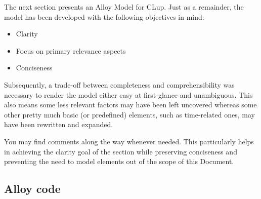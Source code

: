 The next section presents an Alloy Model for CLup. Just as a remainder, the model has been developed with the following objectives in mind: \newline

\begin{itemize}
    \item Clarity
    \item Focus on primary relevance aspects
    \item Conciseness
\end{itemize}

Subsequently, a trade-off between completeness and comprehensibility was necessary to render the model either easy at first-glance and unambiguous. \newline 
This also means some less relevant factors may have been left uncovered whereas some other pretty much basic (or predefined) elements, such as time-related ones, may have been rewritten and expanded. 

You may find comments along the way whenever needed. This particularly helps in achieving the clarity goal of the section while preserving conciseness and preventing the need to model elements out of the scope of this Document.



\subsection{\sffamily Alloy code}


